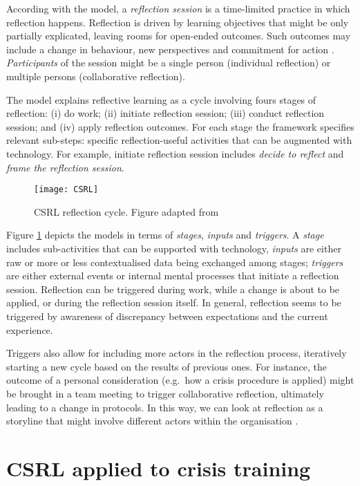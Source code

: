According with the model, a \emph{reflection session} is a time-limited practice in which reflection happens. Reflection is driven by learning objectives that might be only partially explicated, leaving rooms for open-ended outcomes. Such outcomes may include a change in behaviour, new perspectives and commitment for action \autocite{boud1985reflection}. \emph{Participants} of the session might be a single person (individual reflection) or multiple persons (collaborative reflection).

The model explains reflective learning as a cycle involving fours stages of reflection: (i) do work; (ii) initiate reflection session; (iii) conduct reflection session; and (iv) apply reflection outcomes. For each stage the framework specifies relevant sub-steps: specific reflection-useful activities that can be augmented with technology. For example, initiate reflection session includes \emph{decide to reflect} and \emph{frame the reflection session}.
\begin{figure}
	[tbh] \centering 
	\texttt{[image: CSRL]} \caption{CSRL reflection cycle. Figure adapted from \protect\autocite{Krogstie:2013kf}} \label{fig:csrl-model} 
\end{figure}

Figure \ref{fig:csrl-model} depicts the models in terms of \emph{stages}, \emph{inputs} and \emph{triggers}. A \emph{stage} includes sub-activities that can be supported with technology, \emph{inputs} are either raw or more or less contextualised data being exchanged among stages; \emph{triggers} are either external events or internal mental processes that initiate a reflection session. Reflection can be triggered during work, while a change is about to be applied, or during the reflection session itself. In general, reflection seems to be triggered by awareness of discrepancy between expectations and the current experience.

Triggers also allow for including more actors in the reflection process, iteratively starting a new cycle based on the results of previous ones. For instance, the outcome of a personal consideration (e.g.~how a crisis procedure is applied) might be brought in a team meeting to trigger collaborative reflection, ultimately leading to a change in protocols. In this way, we can look at reflection as a storyline that might involve different actors within the organisation \autocite{PrPK13}.

\section{CSRL applied to crisis training}\label{csrl-applied-to-the-design-of-technology-for-crisis-training}

